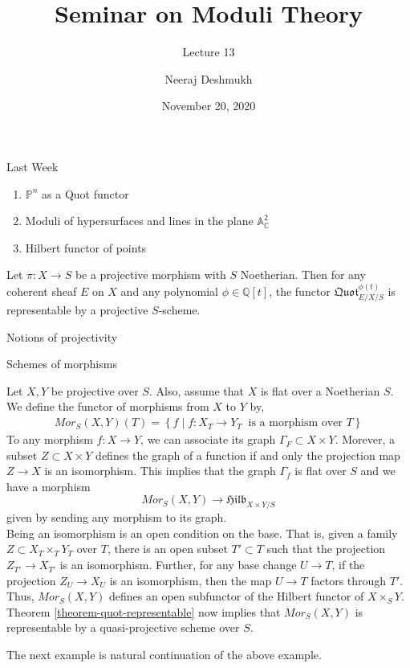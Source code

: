 \documentclass[ignorenonframetext,t]{beamer}
\title[Moduli@IISERP]{Seminar on Moduli Theory}
\subtitle{Lecture 13}
\author{Neeraj Deshmukh}
\date{November 20, 2020}
\newcommand{\A}{{\mathbb A}}
\newcommand{\C}{{\mathbb C}}
\renewcommand{\P}{{\mathbb P}}
\newcommand{\Q}{{\mathbb Q}}
\theoremstyle{definition}
\begin{document}
	
	
\begin{frame}
\titlepage
\end{frame}

\begin{frame}{Last Week}
\begin{enumerate}
	\item $\P^n$ as a Quot functor
	\item Moduli of hypersurfaces and lines in the plane $\A^2_\C$
	\item Hilbert functor of points
\end{enumerate}
\end{frame}


\begin{frame}
\begin{theorem}[Grothendieck]
	\label{theorem-quot-representable}
	Let $\pi: X\rightarrow S$ be a projective morphism with $S$ Noetherian. Then for any coherent sheaf $E$ on $X$ and any polynomial $\phi \in \Q[t]$, the functor $\mathfrak{Quot}^{\phi(t)}_{E/X/S}$ is representable by a projective $S$-scheme.
\end{theorem}
Notions of projectivity
\end{frame}


\begin{frame}
	Schemes of morphisms
\end{frame}

\begin{example}
	\label{example-parametrising-morphisms}
	Let $X, Y$ be projective over $S$. Also, assume that $X$ is flat over a Noetherian $S$. We define the functor of morphisms from $X$ to $Y$ by,
	\begin{align*}
	Mor_S(X,Y)(T)=\left\{f\;|\;f:X_T\rightarrow Y_T \;\;\text{is a morphism over $T$}\right\}
	\end{align*}
	To any morphism $f:X\rightarrow Y$, we can associate its graph $\Gamma_F\subset X\times Y$. Morever, a subset $Z\subset X\times Y$ defines the graph of a function if and only the projection map $Z\rightarrow X$ is an isomorphism. This implies that the graph $\Gamma_f$ is flat over $S$ and we have a morphism
	\[Mor_S(X,Y) \rightarrow \mathfrak{Hilb}_{X\times Y/S}\]
	given by sending any morphism to its graph.\\
	Being an isomorphism is an open condition on the base. That is, given a family $Z\subset X_T\times_T Y_T$ over $T$, there is an open subset $T'\subset T$ such that the projection $Z_{T'}\rightarrow X_{T'}$ is an isomorphism. Further, for any base change $U\rightarrow T$, if the projection $Z_U\rightarrow X_U$ is an isomorphism, then the map $U\rightarrow T$ factors through $T'$. Thus, $Mor_S(X,Y)$ defines an open subfunctor of the Hilbert functor of $X\times_S Y$.\\
	Theorem \ref{theorem-quot-representable} now implies that $Mor_S(X,Y)$ is representable by a quasi-projective scheme over $S$.
\end{example}
The next example is natural continuation of the above example.
\end{document}
